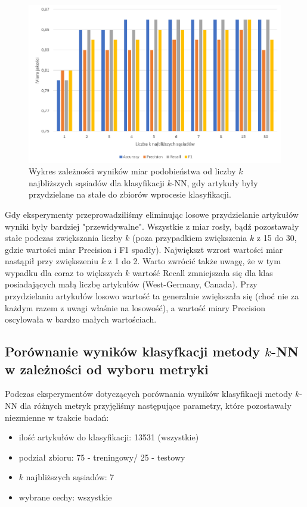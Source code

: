 \documentclass{classrep}
\begin{document}
\begin{figure}[H]
    \centering
    \includegraphics[width=14cm]{wykres_k_const.png}
    \caption{Wykres zależności wyników miar podobieństwa od liczby $k$ najbliższych sąsiadów dla klasyfikacji $k$-NN, gdy artykuły były przydzielane na stałe do zbiorów wprocesie klasyfikacji.}
    \label{wykres:k_stale}
\end{figure}

Gdy eksperymenty przeprowadziliśmy eliminując losowe przydzielanie artykułów wyniki były bardziej "przewidywalne". Wszystkie z miar rosły, bądź pozostawały stałe podczas zwiększania liczby $k$ (poza przypadkiem zwiększenia $k$ z 15 do 30, gdzie wartości miar Precision i F1 spadły). Największt wzrost wartości miar nastąpił przy zwiększeniu $k$ z 1 do 2. Warto zwrócić także uwagę, że w tym wypadku dla coraz to większych $k$ wartość Recall zmniejszała się dla klas posiadających małą liczbę artykułów (West-Germany, Canada). Przy przydzielaniu artykułów losowo wartość ta generalnie zwiększała się (choć nie za każdym razem z uwagi właśnie na losowość), a wartość miary Precision oscylowała w bardzo małych wartościach.

\subsection{Porównanie wyników klasyfkacji metody $k$-NN w zależności od wyboru metryki}

Podczas eksperymentów dotyczących porównania wyników klasyfikacji metody $k$-NN dla różnych metryk przyjęliśmy następujące parametry, które pozostawały niezmienne w trakcie badań:
\begin{itemize}
    \item ilość artykułów do klasyfikacji: 13531 (wszystkie)
    \item podział zbioru: 75 - treningowy/ 25 - testowy
    \item $k$ najbliższych sąsiadów: 7
    \item wybrane cechy: wszystkie
\end{itemize}
\end{document}
